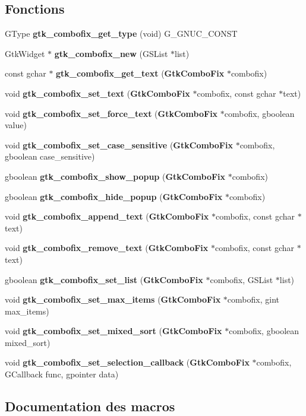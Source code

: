 \subsection*{Fonctions}
\begin{DoxyCompactItemize}
\item 
GType {\bf gtk\_\-combofix\_\-get\_\-type} (void) G\_\-GNUC\_\-CONST
\item 
GtkWidget $\ast$ {\bf gtk\_\-combofix\_\-new} (GSList $\ast$list)
\item 
const gchar $\ast$ {\bf gtk\_\-combofix\_\-get\_\-text} ({\bf GtkComboFix} $\ast$combofix)
\item 
void {\bf gtk\_\-combofix\_\-set\_\-text} ({\bf GtkComboFix} $\ast$combofix, const gchar $\ast$text)
\item 
void {\bf gtk\_\-combofix\_\-set\_\-force\_\-text} ({\bf GtkComboFix} $\ast$combofix, gboolean value)
\item 
void {\bf gtk\_\-combofix\_\-set\_\-case\_\-sensitive} ({\bf GtkComboFix} $\ast$combofix, gboolean case\_\-sensitive)
\item 
gboolean {\bf gtk\_\-combofix\_\-show\_\-popup} ({\bf GtkComboFix} $\ast$combofix)
\item 
gboolean {\bf gtk\_\-combofix\_\-hide\_\-popup} ({\bf GtkComboFix} $\ast$combofix)
\item 
void {\bf gtk\_\-combofix\_\-append\_\-text} ({\bf GtkComboFix} $\ast$combofix, const gchar $\ast$text)
\item 
void {\bf gtk\_\-combofix\_\-remove\_\-text} ({\bf GtkComboFix} $\ast$combofix, const gchar $\ast$text)
\item 
gboolean {\bf gtk\_\-combofix\_\-set\_\-list} ({\bf GtkComboFix} $\ast$combofix, GSList $\ast$list)
\item 
void {\bf gtk\_\-combofix\_\-set\_\-max\_\-items} ({\bf GtkComboFix} $\ast$combofix, gint max\_\-items)
\item 
void {\bf gtk\_\-combofix\_\-set\_\-mixed\_\-sort} ({\bf GtkComboFix} $\ast$combofix, gboolean mixed\_\-sort)
\item 
void {\bf gtk\_\-combofix\_\-set\_\-selection\_\-callback} ({\bf GtkComboFix} $\ast$combofix, GCallback func, gpointer data)
\end{DoxyCompactItemize}


\subsection{Documentation des macros}
